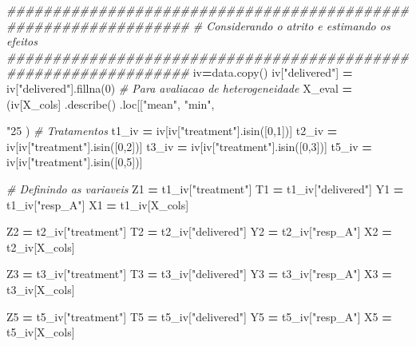 \documentclass[
]{article}
\newenvironment{Shaded}{\begin{snugshade}}{\end{snugshade}}
\newcommand{\CommentTok}[1]{\textcolor[rgb]{0.56,0.35,0.01}{\textit{#1}}}
\newcommand{\DecValTok}[1]{\textcolor[rgb]{0.00,0.00,0.81}{#1}}
\newcommand{\NormalTok}[1]{#1}
\newcommand{\OperatorTok}[1]{\textcolor[rgb]{0.81,0.36,0.00}{\textbf{#1}}}
\newcommand{\StringTok}[1]{\textcolor[rgb]{0.31,0.60,0.02}{#1}}
\begin{document}
\begin{Shaded}
\begin{Highlighting}[]
{\CommentTok{################################################################}
\CommentTok{# Considerando o atrito e estimando os efeitos }
\CommentTok{################################################################}
\NormalTok{iv}\OperatorTok{=}\NormalTok{data.copy()}
\NormalTok{iv[}\StringTok{"delivered"}\NormalTok{] }\OperatorTok{=}\NormalTok{ iv[}\StringTok{"delivered"}\NormalTok{].fillna(}\DecValTok{0}\NormalTok{)}
\CommentTok{# Para avaliacao de heterogeneidade}
\NormalTok{X_eval }\OperatorTok{=}\NormalTok{ (iv[X_cols]}
\NormalTok{    .describe()}
\NormalTok{    .loc[[}\StringTok{"mean"}\NormalTok{, }\StringTok{"min"}\NormalTok{, }\StringTok{"25%"}\NormalTok{, }\StringTok{"50%"}\NormalTok{, }\StringTok{"75%"}\NormalTok{, }\StringTok{"max"}\NormalTok{]]}
\NormalTok{)}
\CommentTok{# Tratamentos}
\NormalTok{t1_iv }\OperatorTok{=}\NormalTok{ iv[iv[}\StringTok{"treatment"}\NormalTok{].isin([}\DecValTok{0}\NormalTok{,}\DecValTok{1}\NormalTok{])]}
\NormalTok{t2_iv }\OperatorTok{=}\NormalTok{ iv[iv[}\StringTok{"treatment"}\NormalTok{].isin([}\DecValTok{0}\NormalTok{,}\DecValTok{2}\NormalTok{])]}
\NormalTok{t3_iv }\OperatorTok{=}\NormalTok{ iv[iv[}\StringTok{"treatment"}\NormalTok{].isin([}\DecValTok{0}\NormalTok{,}\DecValTok{3}\NormalTok{])]}
\NormalTok{t5_iv }\OperatorTok{=}\NormalTok{ iv[iv[}\StringTok{"treatment"}\NormalTok{].isin([}\DecValTok{0}\NormalTok{,}\DecValTok{5}\NormalTok{])]}

\CommentTok{# Definindo as variaveis}
\NormalTok{Z1 }\OperatorTok{=}\NormalTok{ t1_iv[}\StringTok{"treatment"}\NormalTok{]}
\NormalTok{T1 }\OperatorTok{=}\NormalTok{ t1_iv[}\StringTok{"delivered"}\NormalTok{]}
\NormalTok{Y1 }\OperatorTok{=}\NormalTok{ t1_iv[}\StringTok{"resp_A"}\NormalTok{]}
\NormalTok{X1 }\OperatorTok{=}\NormalTok{ t1_iv[X_cols]}

\NormalTok{Z2 }\OperatorTok{=}\NormalTok{ t2_iv[}\StringTok{"treatment"}\NormalTok{]}
\NormalTok{T2 }\OperatorTok{=}\NormalTok{ t2_iv[}\StringTok{"delivered"}\NormalTok{]}
\NormalTok{Y2 }\OperatorTok{=}\NormalTok{ t2_iv[}\StringTok{"resp_A"}\NormalTok{]}
\NormalTok{X2 }\OperatorTok{=}\NormalTok{ t2_iv[X_cols]}

\NormalTok{Z3 }\OperatorTok{=}\NormalTok{ t3_iv[}\StringTok{"treatment"}\NormalTok{]}
\NormalTok{T3 }\OperatorTok{=}\NormalTok{ t3_iv[}\StringTok{"delivered"}\NormalTok{]}
\NormalTok{Y3 }\OperatorTok{=}\NormalTok{ t3_iv[}\StringTok{"resp_A"}\NormalTok{]}
\NormalTok{X3 }\OperatorTok{=}\NormalTok{ t3_iv[X_cols]}

\NormalTok{Z5 }\OperatorTok{=}\NormalTok{ t5_iv[}\StringTok{"treatment"}\NormalTok{]}
\NormalTok{T5 }\OperatorTok{=}\NormalTok{ t5_iv[}\StringTok{"delivered"}\NormalTok{]}
\NormalTok{Y5 }\OperatorTok{=}\NormalTok{ t5_iv[}\StringTok{"resp_A"}\NormalTok{]}
\NormalTok{X5 }\OperatorTok{=}\NormalTok{ t5_iv[X_cols]}

}}
\end{Highlighting}
\end{Shaded}
\end{document}

